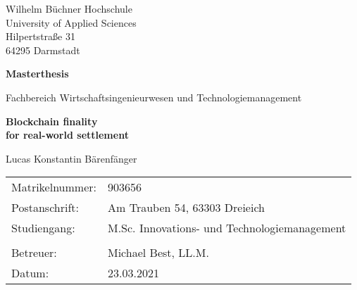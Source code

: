 \begin{titlepage}

	\large
	Wilhelm Büchner Hochschule \\
	University of Applied Sciences \\
	Hilpertstraße 31 \\
	64295 Darmstadt

	\vfill

	\begin{center}
		\Large
			\textbf{Masterthesis}

			\vspace{0.5cm}

			Fachbereich Wirtschaftsingenieurwesen und Technologiemanagement

			\vfill

		\Huge
			\textbf{
				Blockchain finality \\
				for real-world settlement
			}

			\vfill

		\Large
			Lucas Konstantin Bärenfänger
	\end{center}

	\vfill
	
	\begin{tabularx}{\textwidth}{@{}l X}
		Matrikelnummer: & 903656 \\
		Postanschrift:  & Am Trauben 54, 63303 Dreieich \\
		Studiengang:    & M.Sc. Innovations- und Technologiemanagement \\
		\\
		Betreuer:       & Michael Best, LL.M. \\
		Datum:          & 23.03.2021
	\end{tabularx}

\end{titlepage}
